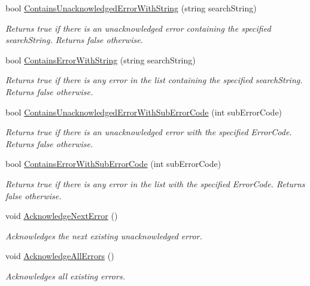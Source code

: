 \begin{DoxyCompactItemize}
bool \mbox{\hyperlink{class_c_s_i_1_1_library_1_1_errors_1_1_error_list_a8848e0b1644a338c73c180b226150cd1}{Contains\+Unacknowledged\+Error\+With\+String}} (string search\+String)
\begin{DoxyCompactList}\small\item\em Returns true if there is an unacknowledged error containing the specified search\+String. Returns false otherwise. \end{DoxyCompactList}\item 
bool \mbox{\hyperlink{class_c_s_i_1_1_library_1_1_errors_1_1_error_list_a190aec44cae9f7829328793047dd9756}{Contains\+Error\+With\+String}} (string search\+String)
\begin{DoxyCompactList}\small\item\em Returns true if there is any error in the list containing the specified search\+String. Returns false otherwise. \end{DoxyCompactList}\item 
bool \mbox{\hyperlink{class_c_s_i_1_1_library_1_1_errors_1_1_error_list_ad54e9277d732adca55c7a11b8aa498ab}{Contains\+Unacknowledged\+Error\+With\+Sub\+Error\+Code}} (int sub\+Error\+Code)
\begin{DoxyCompactList}\small\item\em Returns true if there is an unacknowledged error with the specified Error\+Code. Returns false otherwise. \end{DoxyCompactList}\item 
bool \mbox{\hyperlink{class_c_s_i_1_1_library_1_1_errors_1_1_error_list_a449558309268927f61ab310af7757d33}{Contains\+Error\+With\+Sub\+Error\+Code}} (int sub\+Error\+Code)
\begin{DoxyCompactList}\small\item\em Returns true if there is any error in the list with the specified Error\+Code. Returns false otherwise. \end{DoxyCompactList}\item 
void \mbox{\hyperlink{class_c_s_i_1_1_library_1_1_errors_1_1_error_list_aa9f18e0016fce313792b0499d4f0e408}{Acknowledge\+Next\+Error}} ()
\begin{DoxyCompactList}\small\item\em Acknowledges the next existing unacknowledged error. \end{DoxyCompactList}\item 
void \mbox{\hyperlink{class_c_s_i_1_1_library_1_1_errors_1_1_error_list_a7b50216224a4ba5f76a0d3f2a8456c88}{Acknowledge\+All\+Errors}} ()
\begin{DoxyCompactList}\small\item\em Acknowledges all existing errors. \end{DoxyCompactList}\item 

\end{DoxyCompactItemize}
